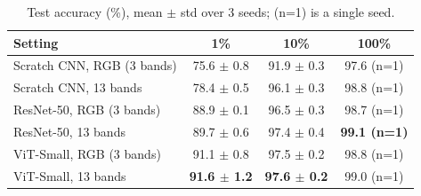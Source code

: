 \begin{table}[t]
\centering
\caption{Test accuracy (\%), mean $\pm$ std over 3 seeds; (n=1) is a single seed.}
\label{tab:supervised_acc}
\small
\begin{tabular}{lccc}
\toprule
Setting & 1\% & 10\% & 100\% \\
\midrule
Scratch CNN, RGB (3 bands) & 75.6 $\pm$ 0.8 & 91.9 $\pm$ 0.3 & 97.6 (n=1) \\
Scratch CNN, 13 bands & 78.4 $\pm$ 0.5 & 96.1 $\pm$ 0.3 & 98.8 (n=1) \\
ResNet-50, RGB (3 bands) & 88.9 $\pm$ 0.1 & 96.5 $\pm$ 0.3 & 98.7 (n=1) \\
ResNet-50, 13 bands & 89.7 $\pm$ 0.6 & 97.4 $\pm$ 0.4 & \textbf{99.1 (n=1)} \\
ViT-Small, RGB (3 bands) & 91.1 $\pm$ 0.8 & 97.5 $\pm$ 0.2 & 98.8 (n=1) \\
ViT-Small, 13 bands & \textbf{91.6 $\pm$ 1.2} & \textbf{97.6 $\pm$ 0.2} & 99.0 (n=1) \\
\bottomrule
\end{tabular}
\end{table}
